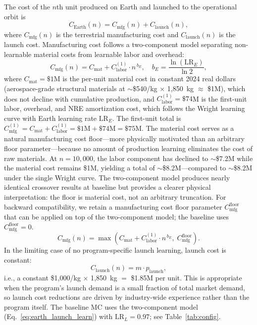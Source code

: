\documentclass[preprint,12pt]{elsarticle}
\begin{document}
The cost of the $n$th unit produced on Earth and launched to the operational orbit is
\begin{equation}
  C_{\mathrm{Earth}}(n) = C_{\mathrm{mfg}}(n) + C_{\mathrm{launch}}(n),
  \label{eq:earth_unit}
\end{equation}
where $C_{\mathrm{mfg}}(n)$ is the terrestrial manufacturing cost and $C_{\mathrm{launch}}(n)$ is the launch cost. Manufacturing cost follows a two-component model separating non-learnable material costs from learnable labor and overhead:
\begin{equation}
  C_{\mathrm{mfg}}(n) = C_{\mathrm{mat}} + C_{\mathrm{labor}}^{(1)} \cdot n^{\,b_E}, \quad b_E = \frac{\ln(\mathrm{LR}_E)}{\ln 2},
  \label{eq:earth_mfg}
\end{equation}
where $C_{\mathrm{mat}} = \$1$M is the per-unit material cost in constant 2024 real dollars (aerospace-grade structural materials at $\sim$\$540/kg $\times$ 1{,}850~kg $\approx$ \$1M), which does not decline with cumulative production, and $C_{\mathrm{labor}}^{(1)} = \$74$M is the first-unit labor, overhead, and NRE amortization cost, which follows the Wright learning curve with Earth learning rate $\mathrm{LR}_E$. The first-unit total is $C_{\mathrm{mfg}}^{(1)} = C_{\mathrm{mat}} + C_{\mathrm{labor}}^{(1)} = \$1\text{M} + \$74\text{M} = \$75\text{M}$. The material cost serves as a natural manufacturing cost floor---more physically motivated than an arbitrary floor parameter---because no amount of production learning eliminates the cost of raw materials. At $n = 10{,}000$, the labor component has declined to $\sim$\$7.2M while the material cost remains \$1M, yielding a total of $\sim$\$8.2M---compared to $\sim$\$8.2M under the single Wright curve. The two-component model produces nearly identical crossover results at baseline but provides a clearer physical interpretation: the floor is material cost, not an arbitrary truncation. For backward compatibility, we retain a manufacturing cost floor parameter $C_{\mathrm{mfg}}^{\mathrm{floor}}$ that can be applied on top of the two-component model; the baseline uses $C_{\mathrm{mfg}}^{\mathrm{floor}} = 0$.
\begin{equation}
  C_{\mathrm{mfg}}(n) = \max\!\left(C_{\mathrm{mat}} + C_{\mathrm{labor}}^{(1)} \cdot n^{\,b_E},\; C_{\mathrm{mfg}}^{\mathrm{floor}}\right).
  \label{eq:earth_mfg_floor}
\end{equation}
In the limiting case of no program-specific launch learning, launch cost is constant:
\begin{equation}
  C_{\mathrm{launch}}(n) = m \cdot p_{\mathrm{launch}},
  \label{eq:earth_launch_baseline}
\end{equation}
i.e., a constant \$1{,}000/kg $\times$ 1{,}850~kg $=$ \$1.85M per unit. This is appropriate when the program's launch demand is a small fraction of total market demand, so launch cost reductions are driven by industry-wide experience rather than the program itself. The baseline MC uses the two-component model (Eq.~\ref{eq:earth_launch_learn}) with $\mathrm{LR}_L = 0.97$; see Table~\ref{tab:config}.
\end{document}
